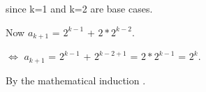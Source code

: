 \documentclass[12pt]{article}
\newcommand{\ind}{\hspace{10mm}}
\begin{document}
\begin{enumerate}
		\ind \ind since k=1 and k=2 are base cases.
		
		\ind Now $a_{k+1}$ = $2^{k-1}$ + $2*2^{k-2}$.
		
		\ind $\iff$ $a_{k+1}$ = $2^{k-1}$ + $2^{k-2+1}$ = $2*2^{k-1}$ = $2^k$.
		
		\ind By the mathematical induction . 
		
		\ind \ind \ind \ind \ind \ind 
		{%
			\setlength{\fboxsep}{1pt}%
			\setlength{\fboxrule}{2pt}%
		}%
			 		
	\end{enumerate}
\end{document}
